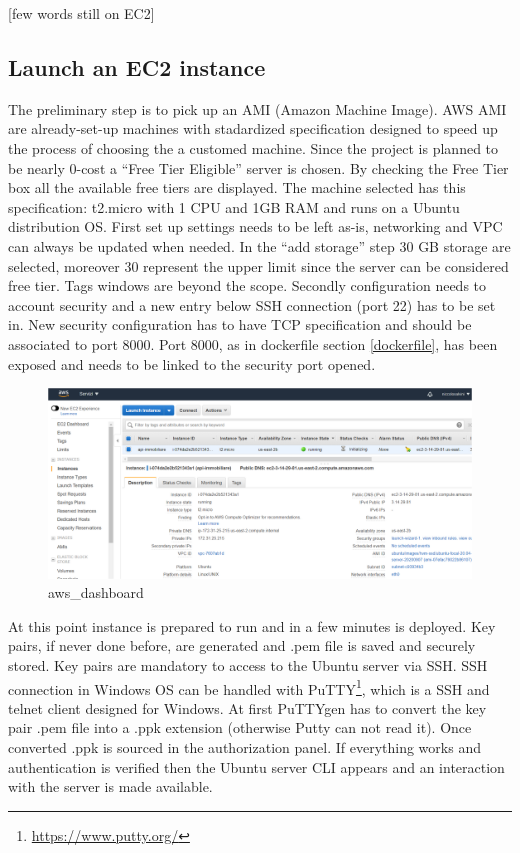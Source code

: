 \documentclass[
  12pt,
  a4paper,
  oneside]{book}
\DeclareRobustCommand{\href}[2]{#2\footnote{\url{#1}}}
\theoremstyle{definition}
\theoremstyle{definition}
\theoremstyle{definition}
\theoremstyle{remark}
\begin{document}
{[}few words still on EC2{]}

\hypertarget{launch-an-ec2-instance}{%
\subsection{Launch an EC2 instance}\label{launch-an-ec2-instance}}

The preliminary step is to pick up an AMI (Amazon Machine Image). AWS AMI are already-set-up machines with stadardized specification designed to speed up the process of choosing the a customed machine. Since the project is planned to be nearly 0-cost a ``Free Tier Eligible'' server is chosen. By checking the Free Tier box all the available free tiers are displayed. The machine selected has this specification: t2.micro with 1 CPU and 1GB RAM and runs on a Ubuntu distribution OS. First set up settings needs to be left as-is, networking and VPC can always be updated when needed. In the ``add storage'' step 30 GB storage are selected, moreover 30 represent the upper limit since the server can be considered free tier. Tags windows are beyond the scope. Secondly configuration needs to account security and a new entry below SSH connection (port 22) has to be set in. New security configuration has to have TCP specification and should be associated to port 8000. Port 8000, as in dockerfile section \ref{dockerfile}, has been exposed and needs to be linked to the security port opened.

\begin{figure}
\centering
\includegraphics{images/aws.PNG}
\caption{aws\_dashboard}
\end{figure}

At this point instance is prepared to run and in a few minutes is deployed. Key pairs, if never done before, are generated and .pem file is saved and securely stored. Key pairs are mandatory to access to the Ubuntu server via SSH. SSH connection in Windows OS can be handled with \href{https://www.putty.org/}{PuTTY}, which is a SSH and telnet client designed for Windows. At first PuTTYgen has to convert the key pair .pem file into a .ppk extension (otherwise Putty can not read it). Once converted .ppk is sourced in the authorization panel. If everything works and authentication is verified then the Ubuntu server CLI appears and an interaction with the server is made available.
\end{document}
